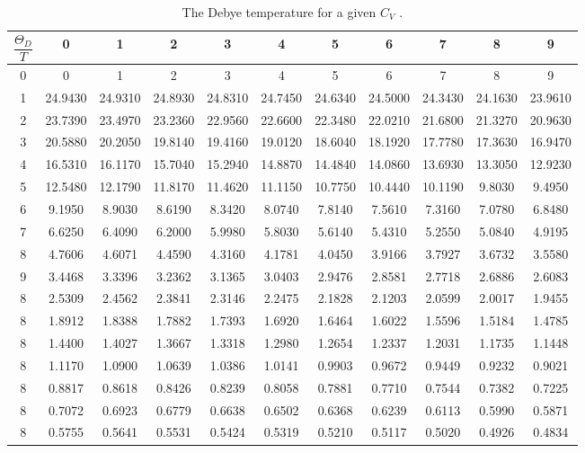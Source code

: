 \begin{table}[H]
\centering
\caption{The Debye temperature for a given $C_V$  \cite{v47}.}
\label{tab:Debye}
\begin{tabular}{c | c c c c c c c c c c}
\toprule
 $\dfrac{\Theta_D}{T} $ &0 & 1 & 2 &3 & 4 & 5&6 & 7 & 8 &9\\
\midrule
    0 & 0       & 1        & 2        & 3     &   4      & 5        & 6        & 7        & 8        &      9 \\
    1 &24.9430  &24.9310   &24.8930   &24.8310&   24.7450&   24.6340&   24.5000&   24.3430&   24.1630&   23.9610\\
    2 &23.7390  &23.4970   &23.2360   &22.9560&   22.6600&   22.3480&   22.0210&   21.6800&   21.3270&   20.9630\\
    3 &20.5880  &20.2050   &19.8140   &19.4160&   19.0120&   18.6040&   18.1920&   17.7780&   17.3630&   16.9470\\
    4 &16.5310  &16.1170   &15.7040   &15.2940&   14.8870&   14.4840&   14.0860&   13.6930&   13.3050&   12.9230\\
    5 &12.5480  &12.1790   &11.8170   &11.4620&   11.1150&   10.7750&   10.4440&   10.1190&   9.8030&    9.4950 \\
    6 &9.1950   &8.9030    &8.6190    &8.3420&    8.0740&    7.8140&    7.5610&    7.3160&    7.0780&    6.8480 \\
    7 &6.6250   &6.4090    &6.2000    &5.9980&    5.8030&    5.6140&    5.4310&    5.2550&    5.0840&    4.9195 \\
    8 &4.7606   &4.6071    &4.4590    &4.3160&    4.1781&    4.0450&    3.9166&    3.7927&    3.6732&    3.5580 \\
    9 &3.4468   &3.3396    &3.2362    &3.1365&    3.0403&    2.9476&    2.8581&    2.7718&    2.6886&    2.6083 \\
    8 &2.5309   &2.4562    &2.3841    &2.3146&    2.2475&    2.1828&    2.1203&    2.0599&    2.0017&    1.9455 \\
    8 &1.8912   &1.8388    &1.7882    &1.7393&    1.6920&    1.6464&    1.6022&    1.5596&    1.5184&    1.4785 \\
    8 &1.4400   &1.4027    &1.3667    &1.3318&    1.2980&    1.2654&    1.2337&    1.2031&    1.1735&    1.1448 \\
    8 &1.1170   &1.0900    &1.0639    &1.0386&    1.0141&    0.9903&    0.9672&    0.9449&    0.9232&    0.9021 \\
    8 &0.8817   &0.8618    &0.8426    &0.8239&    0.8058&    0.7881&    0.7710&    0.7544&    0.7382&    0.7225 \\
    8 &0.7072   &0.6923    &0.6779    &0.6638&    0.6502&    0.6368&    0.6239&    0.6113&    0.5990&    0.5871 \\
    8 &0.5755   &0.5641    &0.5531    &0.5424&    0.5319&    0.5210&    0.5117&    0.5020&    0.4926&    0.4834 \\
    \bottomrule
\end{tabular}
\end{table}
